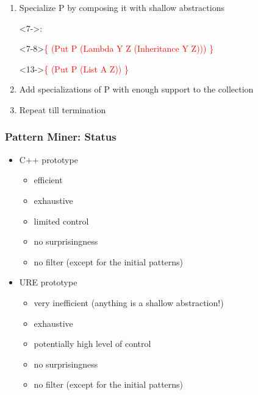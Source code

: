 \documentclass{beamer}
\begin{document}
\begin{frame}[fragile]
{\begin{enumerate}
  \item Specialize P by \alert{composing} it with shallow abstractions\begin{onlyenv}<7->:\end{onlyenv}
      \begin{onlyenv}<7-8>\textcolor{red}{\{ (Put P (Lambda Y Z
          (Inheritance Y Z))) \}}
      \end{onlyenv}\begin{onlyenv}<13->\textcolor{red}{\{ (Put P
          (List A Z)) \}}
      \end{onlyenv}

  \item Add specializations of P with \alert{enough support} to the
    collection
  \item Repeat till termination
  \end{enumerate}}
\end{frame}

\begin{frame}
  \frametitle{Pattern Miner: Status}

  \begin{itemize}
  \item C++ prototype
    \begin{itemize}
    \item efficient
    \item exhaustive
    \item limited control
    \item no surprisingness
    \item no filter (except for the initial patterns)
    \end{itemize}
  \item URE prototype
    \begin{itemize}
    \item very inefficient (anything is a shallow abstraction!)
    \item exhaustive
    \item potentially high level of control
    \item no surprisingness
    \item no filter (except for the initial patterns)
    \end{itemize}
  \end{itemize}

\end{frame}
  
\end{document}
